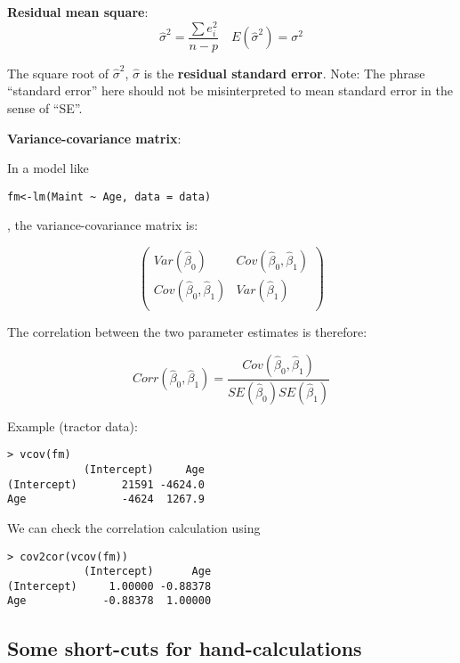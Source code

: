 \medskip


\textbf{Residual mean square}:
\begin{equation}
\hat{\sigma}^2 = \frac{\sum e_i^ 2}{n-p} \quad E(\hat{\sigma}^2)=\sigma^2
\end{equation}

The square root of $\hat{\sigma}^2$, $\hat{\sigma}$ is the \textbf{residual standard error}.
Note: The phrase ``standard error'' here should not be misinterpreted to mean standard error in the sense of ``SE''. 

\textbf{Variance-covariance matrix}:

In a model like \begin{verbatim}fm<-lm(Maint ~ Age, data = data)\end{verbatim}, the variance-covariance matrix is:

\begin{equation}
\begin{pmatrix}
Var(\hat{\beta}_0) & Cov(\hat{\beta}_0,\hat{\beta}_1) \\
Cov(\hat{\beta}_0,\hat{\beta}_1) & Var(\hat{\beta}_1)\\
\end{pmatrix}
\end{equation}

The correlation between the two parameter estimates is therefore:

\begin{equation}
Corr(\hat{\beta}_0,\hat{\beta}_1) = \frac{Cov(\hat{\beta}_0,\hat{\beta}_1)}{SE(\hat{\beta}_0) SE(\hat{\beta}_1)}
\end{equation}


Example (tractor data):

\begin{verbatim}
> vcov(fm)
            (Intercept)     Age
(Intercept)       21591 -4624.0
Age               -4624  1267.9
\end{verbatim}

We can check the correlation calculation using

\begin{verbatim}
> cov2cor(vcov(fm))
            (Intercept)      Age
(Intercept)     1.00000 -0.88378
Age            -0.88378  1.00000
\end{verbatim}



\subsection{Some short-cuts for hand-calculations}

